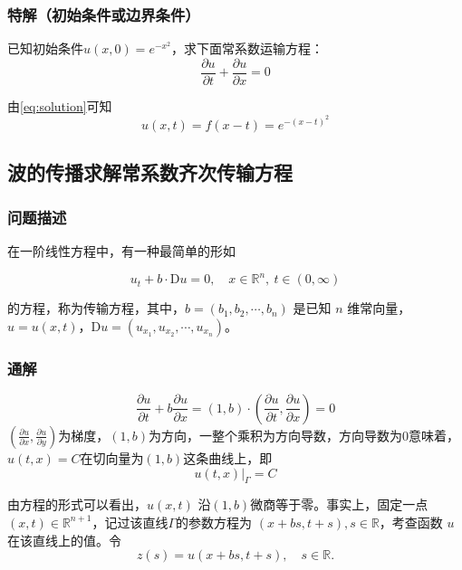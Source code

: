 \documentclass[12pt,a4paper]{article}
\numberwithin{subsection}{section}   %
\numberwithin{subsubsection}{subsection}
\theoremstyle{plain}
\theoremstyle{definition}
\theoremstyle{remark}
\theoremstyle{remark}
\begin{document}
		\subsubsection{特解（初始条件或边界条件）} 
	已知初始条件$	u(x, 0) = e^{-x^2}$，求下面常系数运输方程：
	\begin{equation} 
		\frac{\partial u}{\partial t} +  \frac{\partial u}{\partial x} = 0
	\end{equation}
	
	由\eqref{eq:solution}可知
	\begin{equation}
		u(x, t) = f(x - t)= e^{-(x-t)^2}
	\end{equation}
	
	
	\subsection{波的传播求解常系数齐次传输方程} 
	\subsubsection{问题描述}
	在一阶线性方程中，有一种最简单的形如
	
	\begin{equation}
		u_t + b \cdot \mathrm{D}u = 0, \quad x \in \mathbb{R}^n, \ t \in (0, \infty)
	\end{equation}
	
	的方程，称为传输方程，其中，\(b = (b_1, b_2, \cdots, b_n)\) 是已知 \(n\) 维常向量，\(u = u(x, t)\)，\(\mathrm{D}u = (u_{x_1}, u_{x_2}, \cdots, u_{x_n})\)。
	
		\subsubsection{通解} 
			\begin{equation}
			\frac{\partial u}{\partial t} + b \frac{\partial u}{\partial x}=(1, b) \cdot \left( \frac{\partial u}{\partial t}, \frac{\partial u}{\partial x} \right) = 0 
		\end{equation}
		$\left( \frac{\partial u}{\partial x}, \frac{\partial u}{\partial y} \right)$为梯度，$(1, b)$为方向，一整个乘积为方向导数，方向导数为0意味着，$u(t, x)=C$在切向量为$(1, b)$这条曲线上，即
		\begin{equation}
			u(t,x)|_{\Gamma} = C
		\end{equation}
		
	
	由方程的形式可以看出，\(u(x, t)\) 沿$(1, b)$微商等于零。事实上，固定一点 \((x, t) \in \mathbb{R}^{n+1}\)，记过该直线$\Gamma$的参数方程为 \((x + bs, t + s), s \in \mathbb{R}\)，考查函数 \(u\) 在该直线上的值。令
\begin{equation}
	z(s) = u(x + bs, t + s), \quad s \in \mathbb{R}.
	\end{equation}
	
\end{document}
